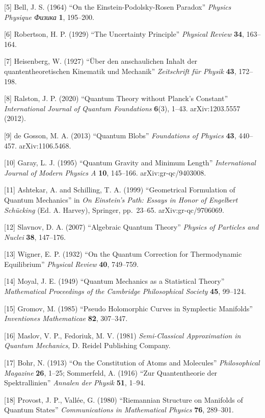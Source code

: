\documentclass[
]{ltjsarticle}
\begin{document}
{[}5{]} Bell, J. S. (1964) ``On the Einstein-Podolsky-Rosen Paradox''
\emph{Physics Physique Физика} \textbf{1}, 195--200.

{[}6{]} Robertson, H. P. (1929) ``The Uncertainty Principle''
\emph{Physical Review} \textbf{34}, 163--164.

{[}7{]} Heisenberg, W. (1927) ``Über den anschaulichen Inhalt der
quantentheoretischen Kinematik und Mechanik'' \emph{Zeitschrift für
Physik} \textbf{43}, 172--198.

{[}8{]} Ralston, J. P. (2020) ``Quantum Theory without Planck's
Constant'' \emph{International Journal of Quantum Foundations}
\textbf{6}(3), 1--43. arXiv:1203.5557 (2012).

{[}9{]} de Gosson, M. A. (2013) ``Quantum Blobs'' \emph{Foundations of
Physics} \textbf{43}, 440--457. arXiv:1106.5468.

{[}10{]} Garay, L. J. (1995) ``Quantum Gravity and Minimum Length''
\emph{International Journal of Modern Physics A} \textbf{10}, 145--166.
arXiv:gr-qc/9403008.

{[}11{]} Ashtekar, A. and Schilling, T. A. (1999) ``Geometrical
Formulation of Quantum Mechanics'' in \emph{On Einstein's Path: Essays
in Honor of Engelbert Schücking} (Ed. A. Harvey), Springer, pp.~23--65.
arXiv:gr-qc/9706069.

{[}12{]} Slavnov, D. A. (2007) ``Algebraic Quantum Theory''
\emph{Physics of Particles and Nuclei} \textbf{38}, 147--176.

{[}13{]} Wigner, E. P. (1932) ``On the Quantum Correction for
Thermodynamic Equilibrium'' \emph{Physical Review} \textbf{40},
749--759.

{[}14{]} Moyal, J. E. (1949) ``Quantum Mechanics as a Statistical
Theory'' \emph{Mathematical Proceedings of the Cambridge Philosophical
Society} \textbf{45}, 99--124.

{[}15{]} Gromov, M. (1985) ``Pseudo Holomorphic Curves in Symplectic
Manifolds'' \emph{Inventiones Mathematicae} \textbf{82}, 307--347.

{[}16{]} Maslov, V. P., Fedoriuk, M. V. (1981) \emph{Semi-Classical
Approximation in Quantum Mechanics}, D. Reidel Publishing Company.

{[}17{]} Bohr, N. (1913) ``On the Constitution of Atoms and Molecules''
\emph{Philosophical Magazine} \textbf{26}, 1--25; Sommerfeld, A. (1916)
``Zur Quantentheorie der Spektrallinien'' \emph{Annalen der Physik}
\textbf{51}, 1--94.

{[}18{]} Provost, J. P., Vallée, G. (1980) ``Riemannian Structure on
Manifolds of Quantum States'' \emph{Communications in Mathematical
Physics} \textbf{76}, 289--301.
\end{document}
